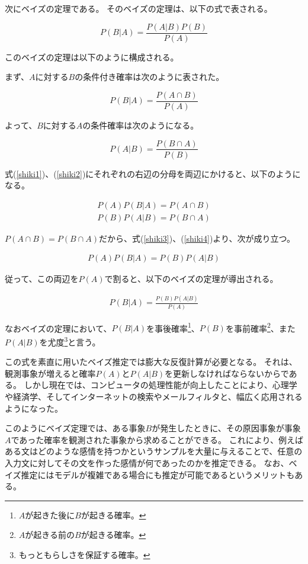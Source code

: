 \documentclass[11pt,a4j]{jsarticle}
\begin{document}
次にベイズの定理である。
そのベイズの定理は、以下の式で表される。

\[
P(B|A)=\frac{P(A|B)P(B)}{P(A)}
\]

このベイズの定理は以下のように構成される。

まず、$A$に対する$B$の条件付き確率は次のように表された。

\begin{equation}
P(B|A)=\frac{P(A \cap B)}{P(A)}
\label{shiki1}
\end{equation}

よって、$B$に対する$A$の条件確率は次のようになる。

\begin{equation}
P(A|B)=\frac{P(B \cap A)}{P(B)}
\label{shiki2}
\end{equation}

式(\ref{shiki1})、(\ref{shiki2})にそれぞれの右辺の分母を両辺にかけると、以下のようになる。

\begin{eqnarray}
  P(A)P(B|A)=P(A \cap B) \label{shiki3}\\
  P(B)P(A|B)=P(B \cap A) \label{shiki4}
\end{eqnarray}


$P(A \cap B)=P(B \cap A)$だから、式(\ref{shiki3})、(\ref{shiki4})より、次が成り立つ。

\begin{eqnarray}
  P(A)P(B|A)=P(B)P(A|B)
\end{eqnarray}

従って、この両辺を$P(A)$で割ると、以下のベイズの定理が導出される。

\begin{eqnarray}
  P(B|A)=\frac{P(B)P(A|B)}{P(A)}
\end{eqnarray}

なおベイズの定理において、$P(B|A)$を事後確率\footnote{$A$が起きた後に$B$が起きる確率。}、$P(B)$を事前確率\footnote{$A$が起きる前の$B$が起きる確率。}、また$P(A|B)$を尤度\footnote{もっともらしさを保証する確率。}と言う。

この式を素直に用いたベイズ推定では膨大な反復計算が必要となる。
それは、観測事象が増えると確率$P(A)$と$P(A|B)$を更新しなければならないからである。
しかし現在では、コンピュータの処理性能が向上したことにより、心理学や経済学、そしてインターネットの検索やメールフィルタと、幅広く応用されるようになった。

このようにベイズ定理では、ある事象$B$が発生したときに、その原因事象が事象$A$であった確率を観測された事象から求めることができる。
これにより、例えばある文はどのような感情を持つかというサンプルを大量に与えることで、任意の入力文に対してその文を作った感情が何であったのかを推定できる。
なお、ベイズ推定にはモデルが複雑である場合にも推定が可能であるというメリットもある。
\end{document}
